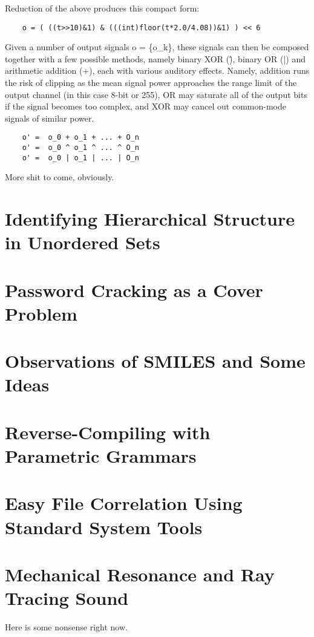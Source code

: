 \documentclass[11pt]{book}
\begin{document}
Reduction of the above produces this compact form:

\begin{verbatim}
	o = ( ((t>>10)&1) & (((int)floor(t*2.0/4.08))&1) ) << 6
\end{verbatim}

Given a number of output signals o = \{o\_k\}, these signals can then be composed together with a few possible
methods, namely binary XOR (\^), binary OR (|) and arithmetic addition (+), each with various auditory effects.
Namely, addition runs the risk of clipping as the mean signal power approaches the range limit of the output
channel (in this case 8-bit or 255), OR may saturate all of the output bits if the signal becomes too complex,
and XOR may cancel out common-mode signals of similar power.

\begin{verbatim}
	o' =  o_0 + o_1 + ... + O_n
	o' =  o_0 ^ o_1 ^ ... ^ O_n
	o' =  o_0 | o_1 | ... | O_n
\end{verbatim}

More shit to come, obviously.

\chapter{Identifying Hierarchical Structure in Unordered Sets}
\chapter{Password Cracking as a Cover Problem}
\chapter{Observations of SMILES and Some Ideas}
\chapter{Reverse-Compiling with Parametric Grammars}
\chapter{Easy File Correlation Using Standard System Tools}
\chapter{Mechanical Resonance and Ray Tracing Sound}

Here is some nonsense right now.

\newcommand{\edge}{\overrightarrow}
\newcommand{\cod}{\mathop{\mathrm{cod}}}
\newcommand{\dom}{\mathop{\mathrm{dom}}}
\end{document}
